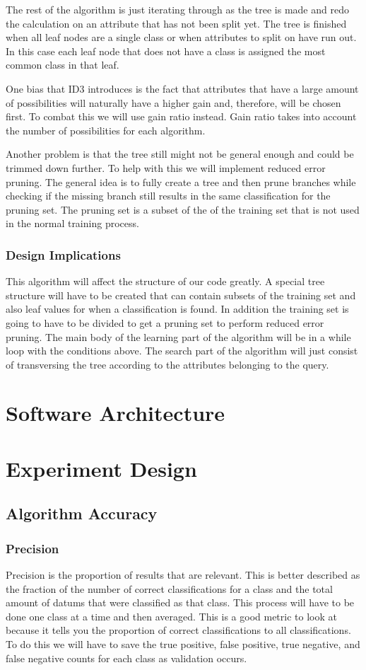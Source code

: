 \documentclass{article}
\begin{document}
				The rest of the algorithm is just iterating through as the tree is made and redo the calculation on an attribute that has not been split yet. The tree is finished when all leaf nodes are a single class or when attributes to split on have run out. In this case each leaf node that does not have a class is assigned the most common class in that leaf.
				
				One bias that ID3 introduces is the fact that attributes that have a large amount of possibilities will naturally have a higher gain and, therefore, will be chosen first. To combat this we will use gain ratio instead. Gain ratio takes into account the number of possibilities for each algorithm.
				
				Another problem is that the tree still might not be general enough and could be trimmed down further. To help with this we will implement reduced error pruning. The general idea is to fully create a tree and then prune branches while checking if the missing branch still results in the same classification for the pruning set. The pruning set is a subset of the of the training set that is not used in the normal training process.
			\subsubsection{Design Implications}
				This algorithm will affect the structure of our code greatly. A special tree structure will have to be created that can contain subsets of the training set and also leaf values for when a classification is found. In addition the training set is going to have to be divided to get a pruning set to perform reduced error pruning. The main body of the learning part of the algorithm will be in a while loop with the conditions above. The search part of the algorithm will just consist of transversing the tree according to the attributes belonging to the query.
		
	\section{Software Architecture}
	\section{Experiment Design}
		\subsection{Algorithm Accuracy}
			\subsubsection{Precision}
			Precision is the proportion of results that are relevant\cite{ai}. This is better described as the fraction of the number of correct classifications for a class and the total amount of datums that were classified as that class. This process will have to be done one class at a time and then averaged.
			This is a good metric to look at because it tells you the proportion of correct classifications to all classifications. To do this we will have to save the true positive, false positive, true negative, and false negative counts for each class as validation occurs.
\end{document}

